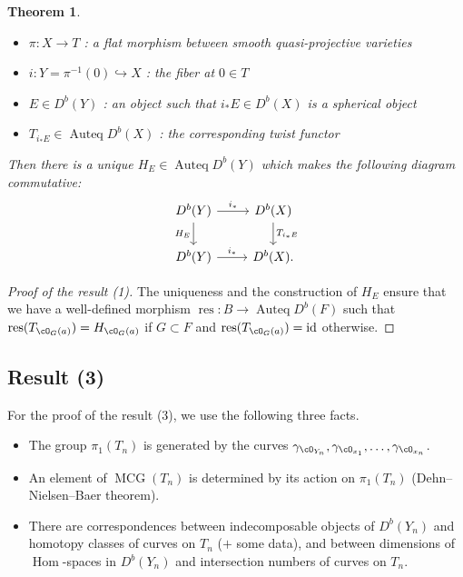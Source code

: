 \documentclass[a0,landscape]{a0poster}
\theoremstyle{plain}
\newtheorem{theorem}{Theorem}[section]
\theoremstyle{definition}
\DeclareMathOperator{\Hom}{\mathrm{Hom}}
\DeclareMathOperator{\Auteq}{\mathrm{Auteq}}
\DeclareMathOperator{\id}{\mathrm{id}}
\DeclareMathOperator{\MCG}{\mathrm{MCG}}
\DeclareMathOperator{\res}{\mathrm{res}}
\begin{document}
\begin{multicols}{3}
    \begin{theorem}
        \quad
        \begin{itemize}
            \item $\pi \colon X \to T$ : a flat morphism between smooth quasi-projective varieties
            \item $i \colon Y = \pi^{-1}(0) \hookrightarrow X$ : the fiber at $0 \in T$
            \item $E \in D^b(Y)$ : an object such that $i_* E \in D^b(X)$ is a spherical object
            \item $T_{i_* E} \in \Auteq D^b(X)$ : the corresponding twist functor
        \end{itemize}
        Then there is a unique $H_E \in \Auteq D^b(Y)$ which makes the following diagram commutative:
        \begin{equation} \label{eq:cd2}
            \begin{tikzcd}
                D^b(Y) \arrow[r,"i_*"]\arrow[d, "H_E"'] & D^b(X) \arrow[d,"T_{i_* E}"]\\
                D^b(Y) \arrow[r, "i_*"]& D^b(X).
            \end{tikzcd}
        \end{equation}
    \end{theorem}


    \begin{tcolorbox}[
            colback = green!10!white,
            colframe = green!10!white,
            fonttitle = \bfseries,
            breakable = true]
        \begin{proof}[Proof of the result (1)]
            The uniqueness and the construction of $H_E$ ensure that we have a well-defined morphism $\res \colon B \to \Auteq D^b(F)$ such that $\res(T_{\cO_G(a)}) = H_{\cO_G(a)}$ if $G \subset F$ and $\res(T_{\cO_G(a)}) = \id$ otherwise.
        \end{proof}
    \end{tcolorbox}
    \subsection{Result (3)}
    For the proof of the result (3), we use the following three facts.
    \begin{itemize}
        \item The group $\pi_1(T_{n})$ is generated by the curves $\gamma_{\cO_{Y_n}}, \gamma_{\cO_{x_1}}, \dots, \gamma_{\cO_{x_{n}}}$.
        \item An element of $\MCG(T_{n})$ is determined by its action on $\pi_1(T_{n})$ (Dehn--Nielsen--Baer theorem).
              \item{\cite{MR3735868, 2020arXiv201108288O}} There are correspondences between indecomposable objects of $D^b(Y_{n})$ and homotopy classes of curves on $T_{n}$ ($+$ some data), and between dimensions of $\Hom$-spaces in $D^b(Y_{n})$ and intersection numbers of curves on $T_{n}$.
    \end{itemize}


\end{multicols}
\end{document}
